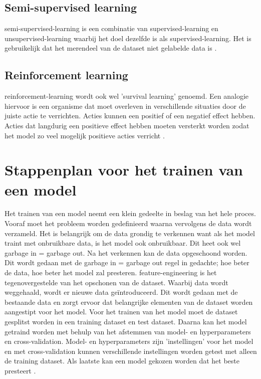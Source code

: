 \subsection{Semi-supervised learning}\label{subsec:semi-supervised-learning}
\Gls{semi-supervised-learning} is een combinatie van \gls{supervised-learning} en \gls{unsupervised-learning} waarbij het doel dezelfde is als \gls{supervised-learning}. Het is gebruikelijk dat het merendeel van de dataset niet gelabelde data is \cite{the-hundred-page-machine-learning-book}.

\subsection{Reinforcement learning}\label{subsec:reinforcement-learning}
\Gls{reinforcement-learning} wordt ook wel 'survival learning' genoemd. Een analogie hiervoor is een organisme dat moet overleven in verschillende situaties door de juiste actie te verrichten. Acties kunnen een positief of een negatief effect hebben. Acties dat langdurig een positieve effect hebben moeten versterkt worden zodat het model zo veel mogelijk positieve acties verricht \cite{bayesian-reasoning-and-machine-learning-book}.

\section{Stappenplan voor het trainen van een model}\label{sec:stappenplan-voor-het-trainen-van-een-model}
Het trainen van een model neemt een klein gedeelte in beslag van het hele proces. Vooraf moet het probleem worden gedefinieerd waarna vervolgens de data wordt verzameld. Het is belangrijk om de data grondig te verkennen want als het model traint met onbruikbare data, is het model ook onbruikbaar. Dit heet ook wel garbage in = garbage out. Na het verkennen kan de data opgeschoond worden. Dit wordt gedaan met de garbage in = garbage out regel in gedachte; hoe beter de data, hoe beter het model zal presteren. \Gls{feature-engineering} is het tegenovergestelde van het opschonen van de dataset. Waarbij data wordt weggehaald, wordt er nieuwe data geïntroduceerd. Dit wordt gedaan met de bestaande data en zorgt ervoor dat belangrijke elementen van de dataset worden aangestipt voor het model. Voor het trainen van het model moet de dataset gesplitst worden in een training dataset en test dataset. Daarna kan het model getraind worden met behulp van het afstemmen van model- en hyperparameters en \gls{cross-validation}. Model- en hyperparameters zijn 'instellingen'
voor het model en met \gls{cross-validation} kunnen verschillende instellingen worden getest met alleen de training dataset. Als laatste kan een model gekozen worden dat het beste presteert \cite{data-science-primer}.

